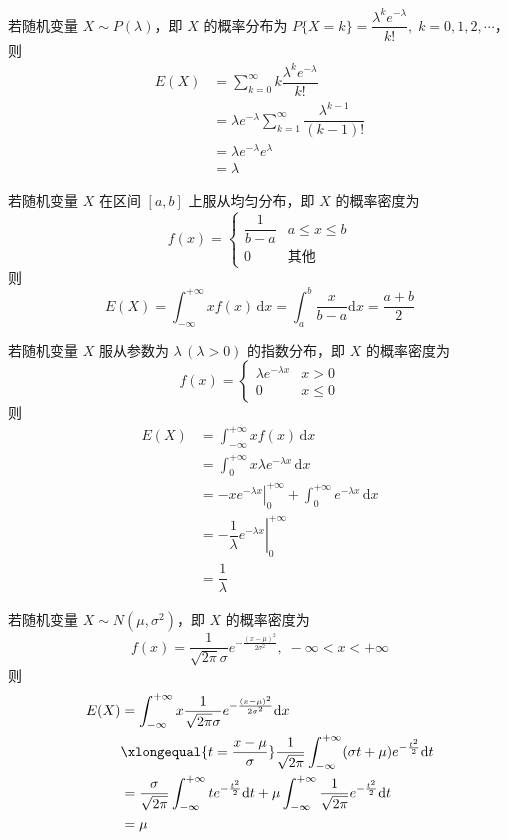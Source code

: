 若随机变量 $X \sim P(\lambda)$，即 $X$ 的概率分布为 $P\{X=k\} = \dfrac{\lambda^k e^{-\lambda}}{k!}, \; k=0,1,2,\cdots$，则
$$
\begin{aligned}
    E(X) &= \sum_{k=0}^{\infty} k \dfrac{\lambda^k e^{-\lambda}}{k!} \\
    &= \lambda e^{-\lambda} \sum_{k=1}^{\infty} \dfrac{\lambda^{k-1}}{(k-1)!} \\
    &= \lambda e^{-\lambda} e^{\lambda} \\
    &= \lambda
\end{aligned}
$$

若随机变量 $X$ 在区间 $[a,b]$ 上服从均匀分布，即 $X$ 的概率密度为
$$
f(x) = \begin{cases}
    \dfrac{1}{b-a} & a \leqslant x \leqslant b \\[0.5em]
    0 & \text{其他}
\end{cases}
$$
则
$$
E(X) = \int_{-\infty}^{+\infty} x f(x) \, \text{d}x = \int_a^b \dfrac{x}{b-a} \text{d}x = \dfrac{a+b}{2}
$$

若随机变量 $X$ 服从参数为 $\lambda \, (\lambda>0)$ 的指数分布，即 $X$ 的概率密度为
$$
f(x) = \begin{cases}
    \lambda e^{-\lambda x} & x>0 \\
    0 & x \leqslant 0
\end{cases}
$$
则
$$
\begin{aligned}
    E(X) &= \int_{-\infty}^{+\infty} x f(x) \, \text{d}x \\
    &= \int_0^{+\infty} x \lambda e^{-\lambda x} \, \text{d}x \\
    &= \left. -xe^{-\lambda x} \right|_0^{+\infty} + \int_0^{+\infty} e^{-\lambda x} \, \text{d}x \\
    &= \left. -\dfrac{1}{\lambda} e^{-\lambda x} \right|_0^{+\infty} \\
    &= \dfrac{1}{\lambda}
\end{aligned}
$$

若随机变量 $X \sim N(\mu,\sigma^2)$，即 $X$ 的概率密度为
$$
f(x) = \dfrac{1}{\sqrt{2 \pi} \sigma} e^{-\frac{(x-\mu)^2}{2 \sigma^2}}, \; -\infty < x < +\infty
$$
则
$$
\begin{aligned}
    E(X) &= \int_{-\infty}^{+\infty} x \dfrac{1}{\sqrt{2 \pi} \sigma} e^{-\frac{(x-\mu)^2}{2 \sigma^2}} \text{d}x \\
    & \xlongequal{t = \frac{x-\mu}{\sigma}} \dfrac{1}{\sqrt{2 \pi}} \int_{-\infty}^{+\infty} (\sigma t + \mu) e^{-\frac{t^2}{2}} \text{d}t \\
    &= \dfrac{\sigma}{\sqrt{2 \pi}} \int_{-\infty}^{+\infty} te^{-\frac{t^2}{2}} \text{d}t + \mu \int_{-\infty}^{+\infty} \dfrac{1}{\sqrt{2 \pi}} e^{-\frac{t^2}{2}} \text{d}t \\
    &= \mu
\end{aligned}
$$

